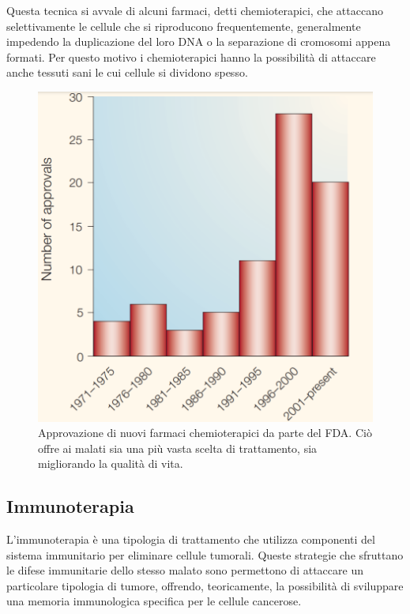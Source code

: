 \documentclass[11pt]{article}
\begin{document}
Questa tecnica si avvale di alcuni farmaci, detti chemioterapici, che attaccano selettivamente le cellule che si riproducono frequentemente, generalmente impedendo la duplicazione del loro DNA o la separazione di cromosomi appena formati. Per questo motivo i chemioterapici hanno la possibilità di attaccare anche tessuti sani le cui cellule si dividono spesso. 

\begin{figure}[H]
	\centering
	\includegraphics[width=0.5\linewidth]{chemioterapia}
	\caption{Approvazione di nuovi farmaci chemioterapici da parte del FDA. Ciò offre ai malati sia una più vasta scelta di trattamento, sia migliorando la qualità di vita.\cite{chabner2005chemotherapy}}
	\label{fig:chemioterapia}
\end{figure}


\subsection*{Immunoterapia}


L'immunoterapia è una tipologia di trattamento che utilizza componenti del sistema immunitario per eliminare cellule tumorali. Queste strategie che sfruttano le difese immunitarie dello stesso malato sono permettono di attaccare un particolare tipologia di tumore, offrendo, teoricamente, la possibilità di sviluppare una memoria immunologica specifica per le cellule cancerose.\cite{bworld}
\end{document}
